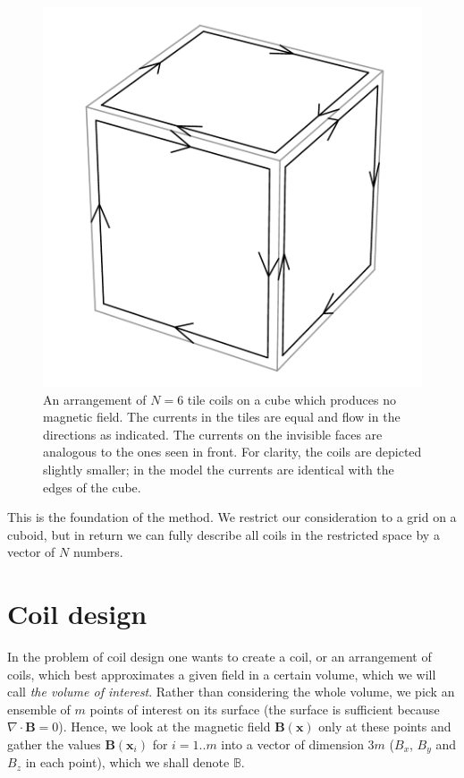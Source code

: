 \begin{figure}
  \centering
  \includegraphics[width=0.5\linewidth]{gfx/coils/tile_kernel2.pdf}
  \caption{An arrangement of $N = 6$ tile coils on a cube which produces no magnetic field. The currents in the tiles are equal and flow in the directions as indicated. The currents on the invisible faces are analogous to the ones seen in front. For clarity, the coils are depicted slightly smaller; in the model the currents are identical with the edges of the cube.}
  \label{fig:coils_tile_kernel}
\end{figure}

This is the foundation of the method. We restrict our consideration to a grid on a cuboid, but in return we can fully describe all coils in the restricted space by a vector of $N$ numbers.



\section{Coil design}
In the problem of coil design one wants to create a coil, or an arrangement of coils, which best approximates a given field in a certain volume, which we will call \emph{the volume of interest}. Rather than considering the whole volume, we pick an ensemble of $m$ points of interest on its surface (the surface is sufficient because $\nabla \cdot \mathbf{B} = 0$). Hence, we look at the magnetic field $\mathbf{B}(\mathbf{x})$ only at these points and gather the values $\mathbf{B}(\mathbf{x}_i)$ for $i = 1 .. m$ into a vector of dimension $3m$ ($B_x$, $B_y$ and $B_z$ in each point), which we shall denote $\mathbb{B}$.


